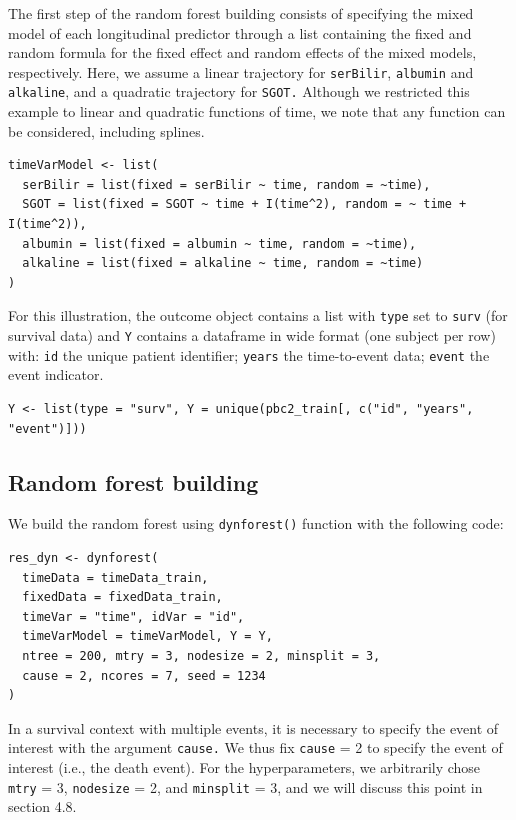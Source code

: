 The first step of the random forest building consists of specifying the mixed model of each longitudinal predictor through a list containing the fixed and random formula for the fixed effect and random effects of the mixed models, respectively. Here, we assume a linear trajectory for \texttt{serBilir}, \texttt{albumin} and \texttt{alkaline}, and a quadratic trajectory for \texttt{SGOT.} Although we restricted this example to linear and quadratic functions of time, we note that any function can be considered, including splines.

\begin{verbatim}
timeVarModel <- list(
  serBilir = list(fixed = serBilir ~ time, random = ~time),
  SGOT = list(fixed = SGOT ~ time + I(time^2), random = ~ time + I(time^2)),
  albumin = list(fixed = albumin ~ time, random = ~time),
  alkaline = list(fixed = alkaline ~ time, random = ~time)
)
\end{verbatim}

For this illustration, the outcome object contains a list with \texttt{type} set to \texttt{surv} (for survival data) and \texttt{Y} contains a dataframe in wide format (one subject per row) with: \texttt{id} the unique patient identifier; \texttt{years} the time-to-event data; \texttt{event} the event indicator.

\begin{verbatim}
Y <- list(type = "surv", Y = unique(pbc2_train[, c("id", "years", "event")]))
\end{verbatim}

\subsection{Random forest building}\label{random-forest-building}

We build the random forest using \texttt{dynforest()} function with the following code:

\begin{verbatim}
res_dyn <- dynforest(
  timeData = timeData_train,
  fixedData = fixedData_train,
  timeVar = "time", idVar = "id",
  timeVarModel = timeVarModel, Y = Y,
  ntree = 200, mtry = 3, nodesize = 2, minsplit = 3,
  cause = 2, ncores = 7, seed = 1234
)
\end{verbatim}

In a survival context with multiple events, it is necessary to specify the event of interest with the argument \texttt{cause.} We thus fix \texttt{cause} = 2 to specify the event of interest (i.e., the death event). For the hyperparameters, we arbitrarily chose \texttt{mtry} = 3, \texttt{nodesize} = 2, and \texttt{minsplit} = 3, and we will discuss this point in section 4.8.

